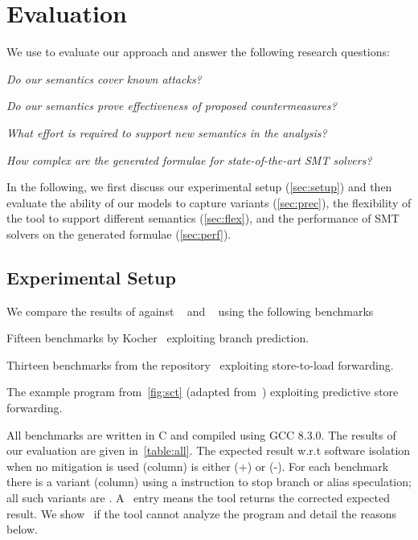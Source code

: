 \documentclass[conference]{IEEEtran}
\begin{document}
\section{Evaluation}
\label{sec:evaluation}

We use \zombmc to evaluate our approach and answer the following research questions:
\begin{description}[labelwidth=\widthof{\bfseries RQ1:}, leftmargin=!]
\item [RQ1:] \emph{Do our semantics cover known attacks?}
\item [RQ2:] \emph{Do our semantics prove effectiveness of proposed countermeasures?}
\item [RQ3:] \emph{What effort is required to support new semantics in the analysis?}
\item [RQ4:] \emph{How complex are the generated formulae for state-of-the-art SMT solvers?}
\end{description}
%
In the following, we first discuss our experimental setup (\autoref{sec:setup}) and then evaluate the ability of our models to capture \spectre variants (\autoref{sec:prec}), the flexibility of the tool to support different semantics (\autoref{sec:flex}), and the performance of SMT solvers on the generated formulae (\autoref{sec:perf}).

\subsection{Experimental Setup}
\label{sec:setup}

We compare the results of \zombmc against \spectector~\cite{GuarnieriKMRS20} and \binsec~\cite{DanielBR20} using the following benchmarks
\begin{description}[labelwidth=\widthof{\bfseries (PHT)}, leftmargin=!]
  \item[(PHT)] Fifteen benchmarks by Kocher~\cite{variants} exploiting branch prediction.
  \item[(STL)] Thirteen benchmarks from the \binsec repository~\cite{spectrev4-litmus} exploiting store-to-load forwarding.
  \item[(PSF)] The example program from~\autoref{fig:sct} (adapted from~\cite{amd-sec2}) exploiting predictive store forwarding.
\end{description}
All benchmarks are written in C and compiled using GCC 8.3.0. 
The results of our evaluation are given in~\autoref{table:all}.
The expected result w.r.t software isolation when no mitigation is used (\none column) is either \safe ({\mygreen +}) or \unsafe ({\red -}).
For each benchmark there is a variant (\fen column) using a \fence instruction to stop branch or alias speculation; all such variants are \safe.
A \gtick\ entry means the tool returns the corrected expected result. 
We show \danger\ if the tool cannot analyze the program and detail the reasons below.
\end{document}
